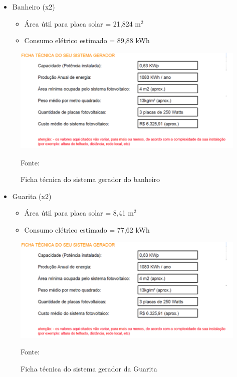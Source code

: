\begin{itemize}
         \item Banheiro (x2)
	           \begin{itemize}
                       \item \'Area \'util para placa solar	=	21,824 m$^{2}$ 
                       \item Consumo el\'etrico estimado	=	89,88 kWh 
                  \end{itemize}	 
\end{itemize}

\begin{figure}[h!]
	  \centering
	 \label{SistemaGeradorBanheiro}
	\includegraphics[keepaspectratio=true,scale=0.8]{figuras/SistemaGeradorBanheiro.png}
	\caption{Ficha t\'ecnica do sistema gerador do banheiro}
	\small{Fonte: \protected\cite{PortalSolar}}
\end{figure}

\begin{itemize}
         \item Guarita (x2)
	           \begin{itemize}
                       \item \'Area \'util para placa solar	=	8,41 m$^{2}$ 
                       \item Consumo el\'etrico estimado	=	77,62 kWh  
                  \end{itemize}	
\end{itemize} 

 \begin{figure}[h!]
	\centering
	\label{SistemaGeradorGuarita}
	\includegraphics[keepaspectratio=true,scale=0.8]{figuras/SistemaGeradorBanheiro.png}
	\caption{Ficha t\'ecnica do sistema gerador da Guarita}
	\small{Fonte: \protected\cite{PortalSolar}}
\end{figure}

